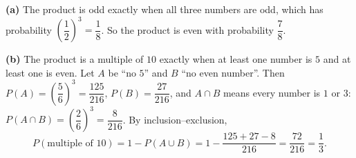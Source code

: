 \textbf{(a)} The product is odd exactly when all three numbers are odd, which has probability $\left(\dfrac12\right)^3=\dfrac18$. So the product is even with probability $\boxed{\dfrac78}$.

\textbf{(b)} The product is a multiple of $10$ exactly when at least one number is $5$ and at least one is even. Let $A$ be ``no $5$'' and $B$ ``no even number''. Then $P(A)=\left(\dfrac56\right)^3=\dfrac{125}{216}$, $P(B)=\dfrac{27}{216}$, and $A\cap B$ means every number is $1$ or $3$: $P(A\cap B)=\left(\dfrac26\right)^3=\dfrac{8}{216}$. By inclusion--exclusion,
\[P(\text{multiple of }10)=1-P(A\cup B)=1-\dfrac{125+27-8}{216}=\dfrac{72}{216}=\boxed{\dfrac13}.\]
